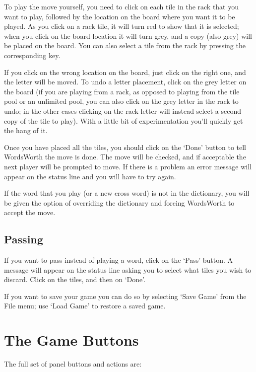 To play the move yourself, you need to click on each tile in the
rack that you want to play, followed by the location on the board
where you want it to be played. As you click on a rack tile, it
will turn red to show that it is selected; when you click on the 
board location it will turn grey, and a copy (also grey) will be
placed on the board. You can also select a tile from the rack by
pressing the corresponding key.

If you click on the wrong location on the board, just click on the
right one, and the letter will be moved. To undo a letter placement,
click on the grey letter on the board (if you are playing from 
a rack, as opposed to playing from the tile pool or an unlimited
pool, you can also click on the grey letter in the rack to undo;
in the other cases clicking on the rack letter will instead select
a second copy of the tile to play).
With a little bit of experimentation you'll quickly get the hang
of it.

Once you have placed all the tiles, you should click on the `Done'
button to tell WordsWorth the move is done. The move will be checked,
and if acceptable the next player will be prompted to move. If there
is a problem an error message will appear on the status line and you
will have to try again.

If the word that you play (or a new cross word) is not in the
dictionary, you will be given the option of overriding the 
dictionary and forcing WordsWorth to accept the move.

\subsection{Passing}

If you want to pass instead of playing a word, click on the `Pass'
button. A message will appear on the status line asking you to select
what tiles you wish to discard. Click on the tiles, and then on
`Done'.

If you want to save your game you can do so by selecting `Save Game'
from the File menu; use `Load Game' to restore a saved game.

\section{The Game Buttons}

The full set of panel buttons and actions are:

